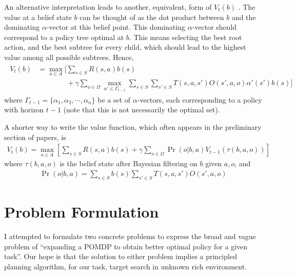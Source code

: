 \documentclass{article}
\begin{document}
An alternative interpretation leads to another, equivalent, form of $V_t(b)$ \cite{pineau2003point}. The value at a belief state $b$ can be thought of as the dot product between $b$ and the dominating $\alpha$-vector at this belief point. This dominating $\alpha$-vector should correspond to a policy tree optimal at $b$. This means selecting the best root action, and the best subtree for every child, which should lead to the highest value among all possible subtrees. Hence,
\begin{align}
\begin{split}
V_t(b) &= \max_{a\in A} \Bigg[ \sum_{s\in S} R(s,a)b(s)\\
&\qquad\qquad+ \gamma \sum_{o\in\Omega} \max_{\alpha'\in \Gamma_{t-1}} \sum_{s\in S} \sum_{s'\in S} T(s,a,s')O(s',a,o)\alpha'(s')b(s)  \Bigg]
\end{split}
\end{align}
where $\Gamma_{t-1}=\{\alpha_1,\alpha_2,\cdots,\alpha_n\}$ be a set of $\alpha$-vectors, each corresponding to a policy with horizon $t-1$ (note that this is not necessarily the optimal set).

A shorter way to write the value function, which often appears in the preliminary section of papers, is \cite{lee2007makes}
\begin{align}
V_t(b) = \max_{a\in A}\left[ \sum_{s\in S} R(s,a)b(s) + \gamma \sum_{o\in\Omega} \Pr(o | b,a) V_{t-1}(\tau(b,a,o))   \right]
\end{align}
where $\tau(b,a,o)$ is the belief state after Bayesian filtering on $b$ given $a,o$, and
\begin{align}
\Pr(o | b,a) = \sum_{s\in S}b(s)\sum_{s'\in S}T(s,a,s')O(s',a,o)
\end{align}






\section{Problem Formulation}

I attempted to formulate two concrete problems to express the broad and vague problem of ``expanding a POMDP to obtain better optimal policy for a given task''. Our hope is that the solution to either problem implies a principled planning algorithm, for our task, target search in unknown rich environment.

\end{document}
